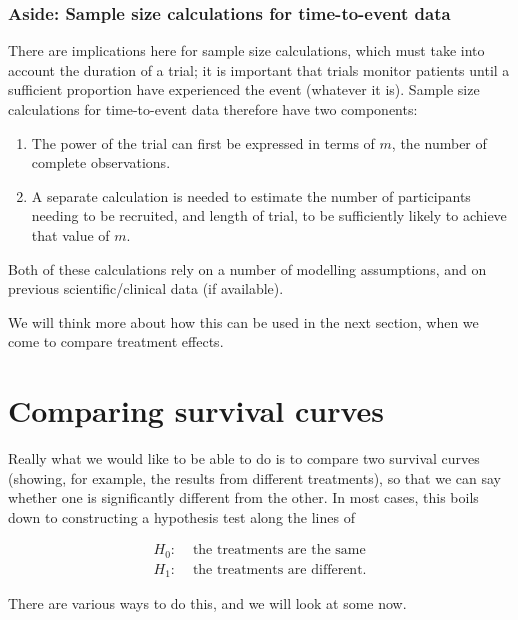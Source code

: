 \documentclass[
  openany]{book}
\providecommand{\tightlist}{%
  \setlength{\itemsep}{0pt}\setlength{\parskip}{0pt}}
\theoremstyle{definition}
\theoremstyle{definition}
\theoremstyle{definition}
\theoremstyle{definition}
\theoremstyle{remark}
\begin{document}
\subsection*{Aside: Sample size calculations for time-to-event data}\label{aside-sample-size-calculations-for-time-to-event-data}

There are implications here for sample size calculations, which must take into account the duration of a trial; it is important that trials monitor patients until a sufficient proportion have experienced the event (whatever it is). Sample size calculations for time-to-event data therefore have two components:

\begin{enumerate}
\def\labelenumi{\arabic{enumi}.}
\tightlist
\item
  The power of the trial can first be expressed in terms of \(m\), the number of complete observations.
\item
  A separate calculation is needed to estimate the number of participants needing to be recruited, and length of trial, to be sufficiently likely to achieve that value of \(m\).
\end{enumerate}

Both of these calculations rely on a number of modelling assumptions, and on previous scientific/clinical data (if available).

We will think more about how this can be used in the next section, when we come to compare treatment effects.

\chapter{Comparing survival curves}\label{comparing-survival-curves}

Really what we would like to be able to do is to compare two survival curves (showing, for example, the results from different treatments), so that we can say whether one is significantly different from the other. In most cases, this boils down to constructing a hypothesis test along the lines of

\begin{align*}
H_0:&\text{ the treatments are the same}\\
H_1:&\text{ the treatments are different.}
\end{align*}

There are various ways to do this, and we will look at some now.
\end{document}
